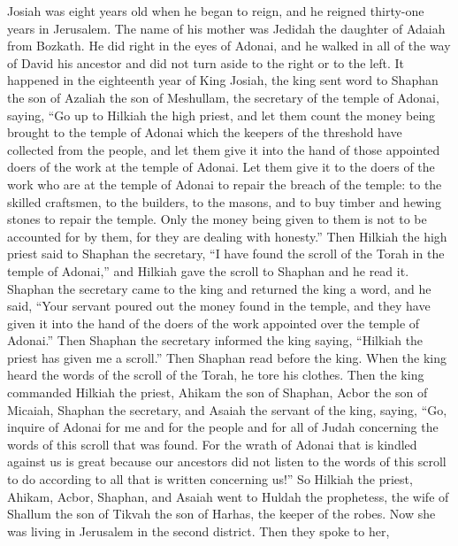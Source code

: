 \begin{biblechapter} %
 Josiah was eight years old when he began to reign, and he reigned thirty-one years in Jerusalem. The name of his mother was Jedidah the daughter of Adaiah from Bozkath.
\verse He did right in the eyes of Adonai, and he walked in all of the way of David his ancestor and did not turn aside to the right or to the left.
\verse It happened in the eighteenth year of King Josiah, the king sent word to Shaphan the son of Azaliah the son of Meshullam, the secretary of the temple of Adonai, saying,
\verse “Go up to Hilkiah the high priest, and let them count the money being brought to the temple of Adonai which the keepers of the threshold have collected from the people,
\verse and let them give it into the hand of those appointed doers of the work at the temple of Adonai. Let them give it to the doers of the work who are at the temple of Adonai to repair the breach of the temple:
\verse to the skilled craftsmen, to the builders, to the masons, and to buy timber and hewing stones to repair the temple.
\verse Only the money being given to them is not to be accounted for by them, for they are dealing with honesty.”
 Then Hilkiah the high priest said to Shaphan the secretary, “I have found the scroll of the Torah in the temple of Adonai,” and Hilkiah gave the scroll to Shaphan and he read it.
\verse Shaphan the secretary came to the king and returned the king a word, and he said, “Your servant poured out the money found in the temple, and they have given it into the hand of the doers of the work appointed over the temple of Adonai.”
\verse Then Shaphan the secretary informed the king saying, “Hilkiah the priest has given me a scroll.” Then Shaphan read before the king.
\verse When the king heard the words of the scroll of the Torah, he tore his clothes.
\verse Then the king commanded Hilkiah the priest, Ahikam the son of Shaphan, Acbor the son of Micaiah, Shaphan the secretary, and Asaiah the servant of the king, saying,
\verse “Go, inquire of Adonai for me and for the people and for all of Judah concerning the words of this scroll that was found. For the wrath of Adonai that is kindled against us is great because our ancestors did not listen to the words of this scroll to do according to all that is written concerning us!”
 So Hilkiah the priest, Ahikam, Acbor, Shaphan, and Asaiah went to Huldah the prophetess, the wife of Shallum the son of Tikvah the son of Harhas, the keeper of the robes. Now she was living in Jerusalem in the second district. Then they spoke to her,

\end{biblechapter}
